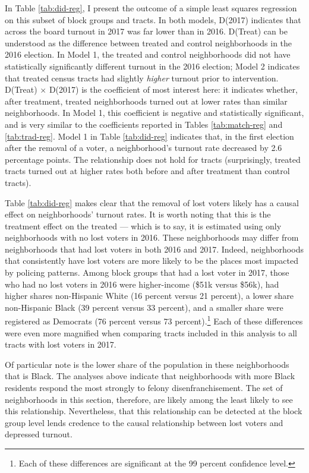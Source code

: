\documentclass[
  12pt,
]{article}
\begin{document}
In Table \ref{tab:did-reg}, I present the outcome of a simple least squares regression on this subset of block groups and tracts. In both models, D(2017) indicates that across the board turnout in 2017 was far lower than in 2016. D(Treat) can be understood as the difference between treated and control neighborhoods in the 2016 election. In Model 1, the treated and control neighborhoods did not have statistically significantly different turnout in the 2016 election; Model 2 indicates that treated census tracts had slightly \emph{higher} turnout prior to intervention. D(Treat) \(\times\) D(2017) is the coefficient of most interest here: it indicates whether, after treatment, treated neighborhoods turned out at lower rates than similar neighborhoods. In Model 1, this coefficient is negative and statistically significant, and is very similar to the coefficients reported in Tables \ref{tab:match-reg} and \ref{tab:trad-reg}. Model 1 in Table \ref{tab:did-reg} indicates that, in the first election after the removal of a voter, a neighborhood's turnout rate decreased by 2.6 percentage points. The relationship does not hold for tracts (surprisingly, treated tracts turned out at higher rates both before and after treatment than control tracts).



Table \ref{tab:did-reg} makes clear that the removal of lost voters likely has a causal effect on neighborhoods' turnout rates. It is worth noting that this is the treatment effect on the treated --- which is to say, it is estimated using only neighborhoods with no lost voters in 2016. These neighborhoods may differ from neighborhoods that had lost voters in both 2016 and 2017. Indeed, neighborhoods that consistently have lost voters are more likely to be the places most impacted by policing patterns. Among block groups that had a lost voter in 2017, those who had no lost voters in 2016 were higher-income (\$51k versus \$56k), had higher shares non-Hispanic White (16 percent versus 21 percent), a lower share non-Hispanic Black (39 percent versus 33 percent), and a smaller share were registered as Democrats (76 percent versus 73 percent).\footnote{Each of these differences are significant at the 99 percent confidence level.} Each of these differences were even more magnified when comparing tracts included in this analysis to all tracts with lost voters in 2017.

Of particular note is the lower share of the population in these neighborhoods that is Black. The analyses above indicate that neighborhoods with more Black residents respond the most strongly to felony disenfranchisement. The set of neighborhoods in this section, therefore, are likely among the least likely to see this relationship. Nevertheless, that this relationship can be detected at the block group level lends credence to the causal relationship between lost voters and depressed turnout.
\end{document}
